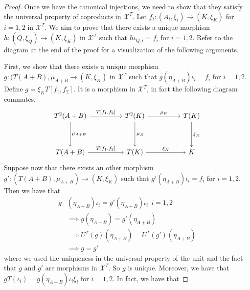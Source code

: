 \begin{subbox}{}
\begin{proof}
        Once we have the canonical injections, we need to show that they satisfy the universal property of coproducts in $\mathcal{X}^T$. Let $f_i:(A_i,\xi_i) \to (K,\xi_K)$ for $i=1,2$ in $\mathcal{X}^T$. We aim to prove that there exists a unique morphism $h:(Q,\xi_Q) \to (K,\xi_K)$ in $\mathcal{X}^T$ such that $h\iota_{Q,i} = f_i$ for $i=1,2$. Refer to the diagram at the end of the proof for a visualization of the following arguments.

        First, we show that there exists a unique morphism $g:(T(A+B),\mu_{A+B} \to (K,\xi_K)$ in $\mathcal{X}^T$ such that $g(\eta_{A+B})\iota_i=f_i$ for $i=1,2$. Define $g=\xi_K T[f_1,f_2]$. It is a morphism in $\mathcal{X}^T$, in fact the following diagram commutes.
        \[
\begin{tikzcd}
T^2(A+B) \arrow[dd, "\mu_{A+B}"] \arrow[rr, "{T[f_1,f_2]}"] &  & T^2(K) \arrow[dd, "\mu_K"] \arrow[rr, "\mu_K"] &  & T(K) \arrow[dd, "\xi_K"] \\
                                                            &  &                                                &  &                          \\
T(A+B) \arrow[rr, "{T[f_1,f_2]}"]                           &  & T(K) \arrow[rr, "\xi_K"]                       &  & K                       
\end{tikzcd}
        \]
        Suppose now that there exists an other morphism $g':(T(A+B),\mu_{A+B}) \to (K,\xi_K)$ such that $g'(\eta_{A+B})\iota_i=f_i$ for $i=1,2$. Then we have that
        \begin{align*}
            g&(\eta_{A+B})\iota_i = g'(\eta_{A+B})\iota_i \ \ i=1,2 \\[1.5ex]
            &\implies g(\eta_{A+B}) = g'(\eta_{A+B}) \\[1.5ex]
            &\implies U^T(g)(\eta_{A+B}) = U^T(g')(\eta_{A+B}) \\[1.5ex]
            &\implies g=g'
        \end{align*}
        where we used the uniqueness in the universal property of the unit and the fact that $g$ and $g'$ are morphisms in $\mathcal{X}^T$. So $g$ is unique. Moreover, we have that $gT(\iota_i) = g (\eta_{A+B}) \iota_i \xi_i$ for $i=1,2$. In fact, we have that

\end{proof}
\end{subbox}
